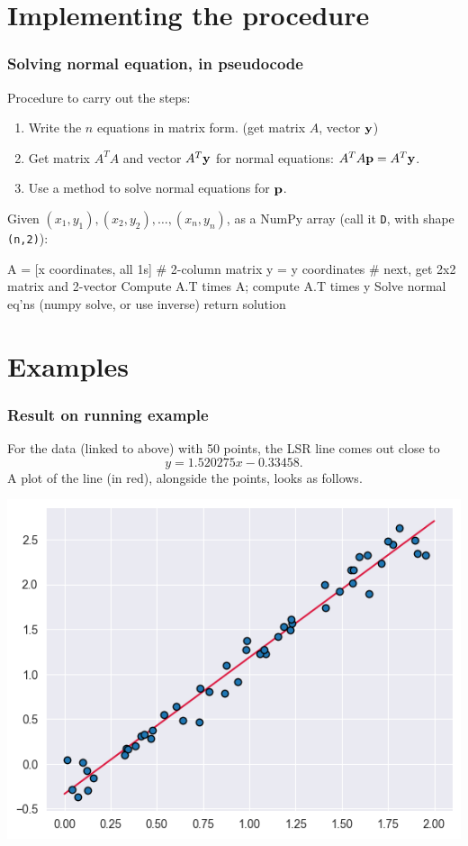 \documentclass{beamer}
\theoremstyle{example}
\newcommand{\ttt}[1]{{\small\texttt{#1}}}
\begin{document}
\section{Implementing the procedure}

\begin{frame}[fragile]
\frametitle{Solving normal equation, in pseudocode}
Procedure to carry out the steps:
\begin{enumerate}
    \item Write the $n$ equations in matrix form. (get matrix $A$, vector ${\bf y}$)
    \item Get matrix $A^TA$ and vector $A^T{\bf y}$ for normal equations: \mbox{$A^TA{\bf p} = A^T{\bf y}$.}
    \item Use a method to solve normal equations for ${\bf p}$.
\end{enumerate}

\pause
\vspace*{12pt}
Given $(x_1,y_1), (x_2,y_2), \ldots, (x_n, y_n)$, as a NumPy array (call it \ttt{D}, with shape \ttt{(n,2)}): 

\begin{pseudo}
A = [x coordinates, all 1s] # 2-column matrix
y = y coordinates
# next, get 2x2 matrix and 2-vector
Compute A.T times A; compute A.T times y
Solve normal eq'ns (numpy solve, or use inverse)
return solution 
\end{pseudo}

\end{frame}

\section{Examples}

\begin{frame}
\frametitle{Result on running example}
For the data (linked to above) with 50 points, the LSR line comes out close to
    \[y = 1.520275x - 0.33458.\]
\pause
A plot of the line (in red), alongside the points, looks as follows.

\vspace*{12pt}
\centering
\includegraphics[height=0.4\textheight]{example1-lsrline.png}
\end{frame}
\end{document}
